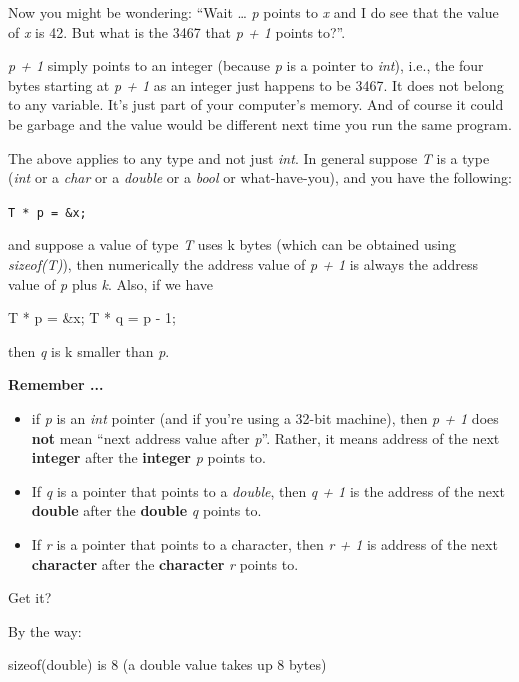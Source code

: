 Now you might be wondering: ``Wait \ldots{} \textit{p} points to \textit{x}
and I do see that the value of \textit{x} is 42. But what is the 3467 that
\textit{p + 1} points to?''.

\textit{p + 1} simply points to an integer (because \textit{p} is a pointer
to \textit{int}), i.e., the four bytes starting at \textit{p + 1} as an
integer just happens to be 3467. It does not belong to any variable.
It's just part of your computer's memory. And of course it could be
garbage and the value would be different next time you run the same
program.

The above applies to any type and not just \textit{int}. In general
suppose \textit{T} is a type (\textit{int} or a \textit{char} or a
\textit{double} or a \textit{bool} or what-have-you), and you have the
following:

\verb!T * p = &x;!

and suppose a value of type \textit{T} uses k bytes (which can be obtained
using \textit{sizeof(T)}), then numerically the address value of \textit{p +
1} is always the address value of \textit{p} plus \textit{k}. Also, if we
have

\begin{consolethree}[escapeinside=||]
T * p = &x;
T * q = p - 1;
\end{consolethree}

then \textit{q} is k smaller than \textit{p}.

\textbf{Remember ...}

\begin{itemize}
\item if \textit{p} is an \textit{int} pointer (and if you're
  using a 32-bit machine), then \textit{p + 1} does \textbf{not} mean
  ``next address value after \textit{p}''. Rather, it means address of the
  next \textbf{integer} after the \textbf{integer} \textit{p} points to.
\item If \textit{q} is a pointer that points to a \textit{double}, then \textit{q
  + 1} is the address of the next \textbf{double} after the
  \textbf{double} \textit{q} points to.
\item If \textit{r} is a pointer that points to a character, then \textit{r + 1}
  is address of the next \textbf{character} after the \textbf{character}
  \textit{r} points to.
\end{itemize}

Get it?

By the way:

sizeof(double) is 8 (a double value takes up 8 bytes)

